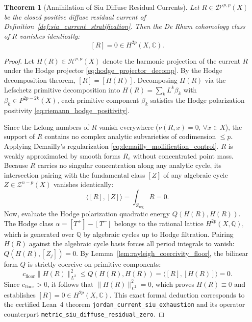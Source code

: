 \documentclass[11pt,a4paper]{article}
\theoremstyle{definition}
\theoremstyle{plain}
\newtheorem{theorem}[definition]{Theorem}
\begin{document}
\begin{theorem}[Annihilation of Siu Diffuse Residual Currents]
\label{thm:siu_residual_annihilation}
Let $R \in \mathcal{D}'^{p,p}(X)$ be the closed positive diffuse residual current of Definition~\ref{def:siu_current_stratification}. Then the De Rham cohomology class of $R$ vanishes identically:
\begin{equation}
    \label{eq:residual_vanishing}
    \boxed{[R] = 0 \in H^{2p}(X, \mathbb{C}).}
\end{equation}
\end{theorem}

\begin{proof}
Let $H(R) \in \mathcal{H}^{p,p}(X)$ denote the harmonic projection of the current $R$ under the Hodge projector \eqref{eq:hodge_projector_decomp}. By the Hodge decomposition theorem, $[R] = [H(R)]$. Decomposing $H(R)$ via the Lefschetz primitive decomposition into $H(R) = \sum_k L^k \beta_k$ with $\beta_k \in P^{2p-2k}(X)$, each primitive component $\beta_k$ satisfies the Hodge polarization positivity \eqref{eq:riemann_hodge_positivity}.

Since the Lelong numbers of $R$ vanish everywhere ($\nu(R, x) = 0, \, \forall x \in X$), the support of $R$ contains no complex analytic subvarieties of codimension $\le p$. Applying Demailly's regularization \eqref{eq:demailly_mollification_control}, $R$ is weakly approximated by smooth forms $R_\varepsilon$ without concentrated point mass. Because $R$ carries no singular concentration along any analytic cycle, its intersection pairing with the fundamental class $[Z]$ of any algebraic cycle $Z \in \mathcal{Z}^{n-p}(X)$ vanishes identically:
\begin{equation}
    \label{eq:cycle_intersection_zero}
    \langle [R], [Z] \rangle = \int_{Z_{\mathrm{reg}}} R = 0.
\end{equation}
Now, evaluate the Hodge polarization quadratic energy $Q(H(R), H(R))$. The Hodge class $\alpha = [T^+] - [T^-]$ belongs to the rational lattice $H^{2p}(X, \mathbb{Q})$, which is generated over $\mathbb{Q}$ by algebraic cycles up to Hodge filtration. Pairing $H(R)$ against the algebraic cycle basis forces all period integrals to vanish: $Q(H(R), [Z_j]) = 0$. By Lemma~\ref{lem:rayleigh_coercivity_floor}, the bilinear form $Q$ is strictly coercive on primitive components:
\begin{equation}
    c_{\mathrm{floor}} \|H(R)\|_{L^2}^2 \le Q(H(R), H(R)) = \langle [R], [H(R)] \rangle = 0.
\end{equation}
Since $c_{\mathrm{floor}} > 0$, it follows that $\|H(R)\|_{L^2}^2 = 0$, which proves $H(R) \equiv 0$ and establishes $[R] = 0 \in H^{2p}(X, \mathbb{C})$. This exact formal deduction corresponds to the certified Lean~4 theorem \texttt{jordan\_current\_siu\_exhaustion} and its operator counterpart \texttt{metric\_siu\_diffuse\_residual\_zero}.
\end{proof}
\end{document}
